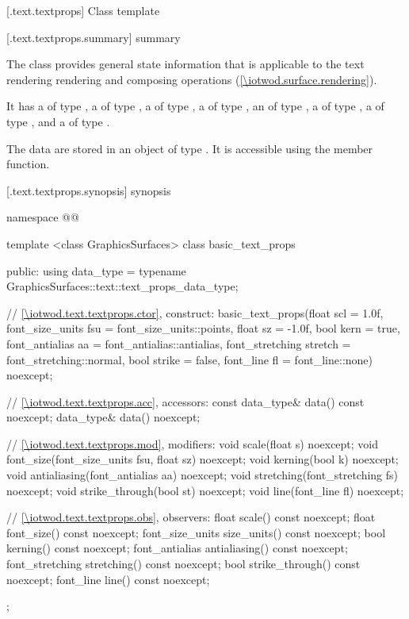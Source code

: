
 [\iotwod.text.textprops] {Class template }

 [\iotwod.text.textprops.summary] { summary}

\pnum
{}%
The  class provides general state information that is applicable to the text rendering rendering and composing operations (\ref{\iotwod.surface.rendering}).

\pnum
It has a  of type , a  of type , a  of type , a  of type , an  of type , a  of type , a  of type , and a  of type .

\pnum
The data are stored in an object of type . It is accessible using the  member function.

 [\iotwod.text.textprops.synopsis] { synopsis}

\begin{codeblock}
namespace @\fullnamespace{}@ {
  template <class GraphicsSurfaces>
  class basic_text_props {
  public:
    using data_type = typename GraphicsSurfaces::text::text_props_data_type;

    // \ref{\iotwod.text.textprops.ctor}, construct:
    basic_text_props(float scl = 1.0f,
      font_size_units fsu = font_size_units::points,
      float sz = -1.0f,
      bool kern = true,
      font_antialias aa = font_antialias::antialias,
      font_stretching stretch = font_stretching::normal,
      bool strike = false,
      font_line fl = font_line::none) noexcept;

    // \ref{\iotwod.text.textprops.acc}, accessors:
    const data_type& data() const noexcept;
    data_type& data() noexcept;

    // \ref{\iotwod.text.textprops.mod}, modifiers:
    void scale(float s) noexcept;
    void font_size(font_size_units fsu, float sz) noexcept;
    void kerning(bool k) noexcept;
    void antialiasing(font_antialias aa) noexcept;
    void stretching(font_stretching fs) noexcept;
    void strike_through(bool st) noexcept;
    void line(font_line fl) noexcept;

    // \ref{\iotwod.text.textprops.obs}, observers:
    float scale() const noexcept;
    float font_size() const noexcept;
    font_size_units size_units() const noexcept;
    bool kerning() const noexcept;
    font_antialias antialiasing() const noexcept;
    font_stretching stretching() const noexcept;
    bool strike_through() const noexcept;
    font_line line() const noexcept;
  };
}
\end{codeblock}

